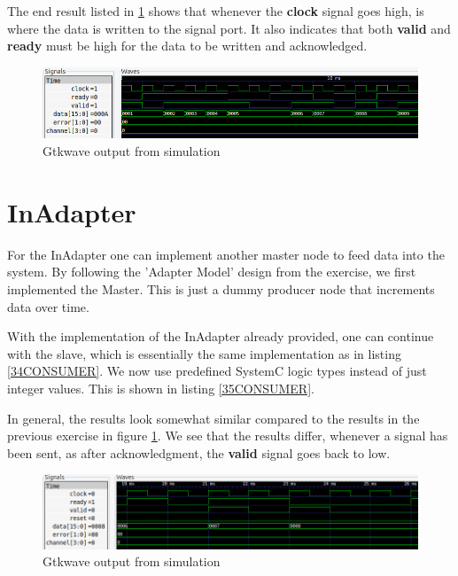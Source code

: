 \documentclass[a4paper,12pt]{report}    %
\begin{document}
The end result listed in \ref{FIG::34} shows that whenever the \textbf{clock} signal goes high, is where the data is written to the signal port. It also indicates that both \textbf{valid} and \textbf{ready} must be high for the data to be written and acknowledged.

\begin{figure}[h]
  \includegraphics[width=\linewidth]{../code/src/assignment1/MasterSlave/out/out.png}
  \caption{Gtkwave output from simulation}
  \label{FIG::34}
\end{figure}






\section{InAdapter}

For the InAdapter one can implement another master node to feed data into the system. By following the 'Adapter Model' design from the exercise, we first implemented the Master. This is just a dummy producer node that increments data over time.



With the implementation of the InAdapter already provided, one can continue with the slave, which is essentially the same implementation as in listing \ref{34CONSUMER}. We now use predefined SystemC logic types instead of just integer values. This is shown in listing \ref{35CONSUMER}.



In general, the results look somewhat similar compared to the results in the previous exercise in figure \ref{FIG::34}. We see that the results differ, whenever a signal has been sent, as after acknowledgment, the \textbf{valid} signal goes back to low. 

\begin{figure}[h]
  \includegraphics[width=\linewidth]{../code/src/assignment1/InAdapter/out/out.png}
  \caption{Gtkwave output from simulation}
  \label{FIG::35}
\end{figure}
\end{document}
